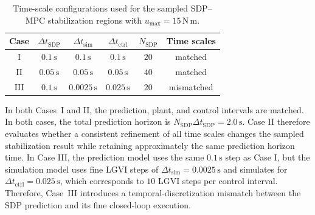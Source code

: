 \begin{table}[!htbp]
    \centering
    \caption{Time-scale configurations used for the sampled SDP--MPC
    stabilization regions with $u_{\max}=15\,\mathrm{N\,m}$.}
    \label{tab:acrobot_mpc_time_scale_cases}
    \setlength{\tabcolsep}{7pt}
    \renewcommand{\arraystretch}{1.15}
    \begin{tabular}{@{}cccccc@{}}
        \toprule
        Case & $\Delta t_{\mathrm{SDP}}$ & $\Delta t_{\mathrm{sim}}$
        & $\Delta t_{\mathrm{ctrl}}$ & $N_{\mathrm{SDP}}$ & Time scales \\
        \midrule
        I   & $0.1\,\mathrm{s}$  & $0.1\,\mathrm{s}$
            & $0.1\,\mathrm{s}$   & $20$ & matched \\
        II  & $0.05\,\mathrm{s}$ & $0.05\,\mathrm{s}$
            & $0.05\,\mathrm{s}$  & $40$ & matched \\
        III & $0.1\,\mathrm{s}$  & $0.0025\,\mathrm{s}$
            & $0.025\,\mathrm{s}$ & $20$ & mismatched \\
        \bottomrule
    \end{tabular}
\end{table}

In both Cases~I and II, the prediction, plant, and control intervals are
matched. In both cases, the total prediction horizon is
$N_{\mathrm{SDP}}\Delta t_{\mathrm{SDP}}=2.0\,\mathrm{s}$. Case II
therefore evaluates whether a consistent refinement of all time scales changes
the sampled stabilization result while retaining approximately the same
prediction horizon time. In Case III, the prediction model uses the same
$0.1\,\mathrm{s}$ step as Case I, but the simulation model uses
fine LGVI steps of $\Delta t_{\mathrm{sim}}=0.0025\,\mathrm{s}$ 
and simulates for $\Delta t_{\mathrm{ctrl}}=0.025\,\mathrm{s}$, which corresponds to
$10$ LGVI steps per control interval. Therefore, Case~III introduces 
a temporal-discretization mismatch between
the SDP prediction and its fine closed-loop execution.

